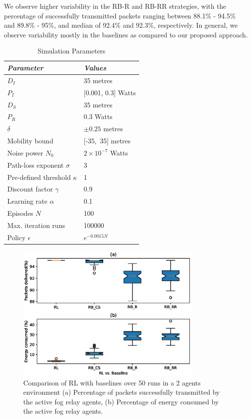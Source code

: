 \documentclass[journal]{IEEEtran}
\begin{document}
We observe higher variability in the RB-R and RB-RR strategies, with the percentage of successfully transmitted packets ranging between 88.1\% - 94.5\% and 89.8\% - 95\%, and median of 92.4\% and 92.3\%, respectively. In general, we observe variability mostly in the baselines as compared to our proposed approach.

\begin{table}
\small
\centering
\caption{Simulation Parameters}
\label{table:simparameters}
\begin{tabular}{ll}
  \hline
 \textit{Parameter} & \textit{Values} \\
  \hline \hline

   $D_{I}$ & 35 metres\\
   $P_{I}$ & [0.001, 0.3] Watts \\
   $D_{S}$ & 35 metres\\
   $P_{R}$ & 0.3 Watts\\
   $\delta$ & $\pm0.25$ metres\\
   Mobility bound & [-35,~35] metres\\
   Noise power $N_0$ & $2 \times 10^{-7}$ Watts\\
   Path-loss exponent $\sigma$ & 3\\
   Pre-defined threshold $\kappa$ & 1\\
   Discount factor $\gamma$ & 0.9\\
   Learning rate $\alpha$ & 0.1\\
   Episodes $N$ & 100\\
   Max. iteration runs & 100000\\
   Policy $\epsilon$ & $e^{-0.0015N}$\\

   \hline \hline
 \end{tabular}
 \end{table}



\begin{figure}[!t]
\centering
\includegraphics[width=3.6in]{2agentbaseline.eps}
\caption{Comparison of RL with baselines over 50 runs in a 2 agents environment (a) Percentage of packets successfully transmitted by the active fog relay agents,  (b) Percentage of energy consumed by the active fog relay agents.}
\label{2agent}
\end{figure}
\end{document}
